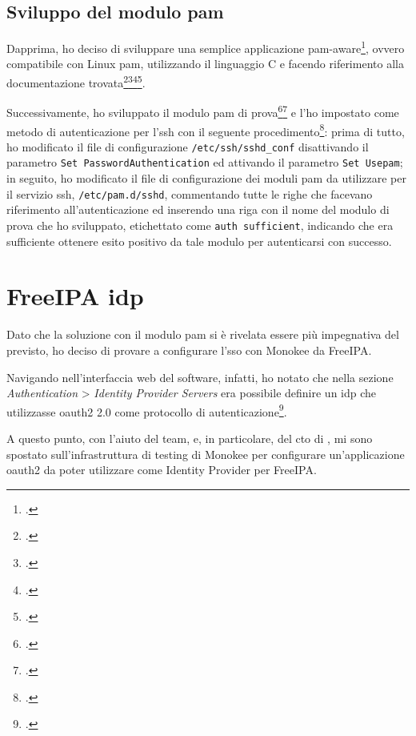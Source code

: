 \subsection{Sviluppo del modulo \acrshort{pam}}
Dapprima, ho deciso di sviluppare una semplice applicazione \acrshort{pam}-aware\footcite{site:pam-app}, ovvero compatibile con Linux \acrshort{pam}, utilizzando il linguaggio C e facendo riferimento alla documentazione trovata\footcite{site:writing-pam-application}\footcite{site:understanding-pam}\footcite{site:pam-configuration}\footcite{site:linux-man-online}.  

Successivamente, ho sviluppato il modulo \acrshort{pam} di prova\footcite{site:pam-module}\footcite{site:pam-module-oidc} e l'ho impostato come metodo di autenticazione per l'\acrshort{ssh} con il seguente procedimento\footcite{site:writing-pam-module}: prima di tutto, ho modificato il file di configurazione \texttt{/etc/ssh/sshd\_conf} disattivando il parametro \texttt{Set PasswordAuthentication} ed attivando il parametro \texttt{Set Use\acrshort{pam}}; in seguito, ho modificato il file di configurazione dei moduli \acrshort{pam} da utilizzare per il servizio \acrshort{ssh}, \texttt{/etc/pam.d/sshd}, commentando tutte le righe che facevano riferimento all'autenticazione ed inserendo una riga con il nome del modulo di prova che ho sviluppato, etichettato come \texttt{auth  sufficient}, indicando che era sufficiente ottenere esito positivo da tale modulo per autenticarsi con successo. 

\section{FreeIPA \acrshort{idp}}

Dato che la soluzione con il modulo \acrshort{pam} si è rivelata essere più impegnativa del previsto, ho deciso di provare a configurare l'\acrshort{sso} con Monokee da FreeIPA. 

Navigando nell'interfaccia web del software, infatti, ho notato che nella sezione \textit{Authentication} > \textit{Identity Provider Servers} era possibile definire un \acrshort{idp} che utilizzasse \acrshort{oauth2} 2.0 come protocollo di autenticazione\footcite{site:freeipa-docs}.

A questo punto, con l'aiuto del team, e, in particolare, del \acrfull{cto} di \myAzienda, mi sono spostato sull'infrastruttura di testing di Monokee per configurare un'applicazione \acrshort{oauth2} da poter utilizzare come Identity Provider per FreeIPA.

